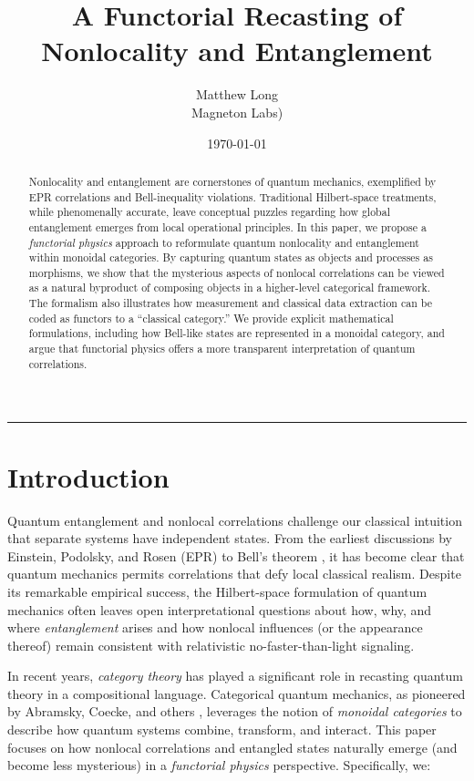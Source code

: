 \documentclass[12pt]{article}
\title{\bf A Functorial Recasting of Nonlocality and Entanglement}
\author{Matthew Long \\
Magneton Labs)}
\date{\today}
\begin{document}
\maketitle

\begin{abstract}
Nonlocality and entanglement are cornerstones of quantum mechanics, exemplified by EPR correlations and Bell-inequality violations. Traditional Hilbert-space treatments, while phenomenally accurate, leave conceptual puzzles regarding how global entanglement emerges from local operational principles. In this paper, we propose a \emph{functorial physics} approach to reformulate quantum nonlocality and entanglement within monoidal categories. By capturing quantum states as objects and processes as morphisms, we show that the mysterious aspects of nonlocal correlations can be viewed as a natural byproduct of composing objects in a higher-level categorical framework. The formalism also illustrates how measurement and classical data extraction can be coded as functors to a ``classical category.'' We provide explicit mathematical formulations, including how Bell-like states are represented in a monoidal category, and argue that functorial physics offers a more transparent interpretation of quantum correlations.
\end{abstract}

\hrule
\vspace{1em}

\section{Introduction}
Quantum entanglement and nonlocal correlations challenge our classical intuition that separate systems have independent states. From the earliest discussions by Einstein, Podolsky, and Rosen (EPR) \cite{EPR1935} to Bell’s theorem \cite{Bell1964}, it has become clear that quantum mechanics permits correlations that defy local classical realism. Despite its remarkable empirical success, the Hilbert-space formulation of quantum mechanics often leaves open interpretational questions about how, why, and where \emph{entanglement} arises and how nonlocal influences (or the appearance thereof) remain consistent with relativistic no-faster-than-light signaling.

In recent years, \emph{category theory} has played a significant role in recasting quantum theory in a compositional language. Categorical quantum mechanics, as pioneered by Abramsky, Coecke, and others \cite{AbramskyCoecke, HeunenVicary}, leverages the notion of \emph{monoidal categories} to describe how quantum systems combine, transform, and interact. This paper focuses on how nonlocal correlations and entangled states naturally emerge (and become less mysterious) in a \emph{functorial physics} perspective. Specifically, we:
\end{document}
